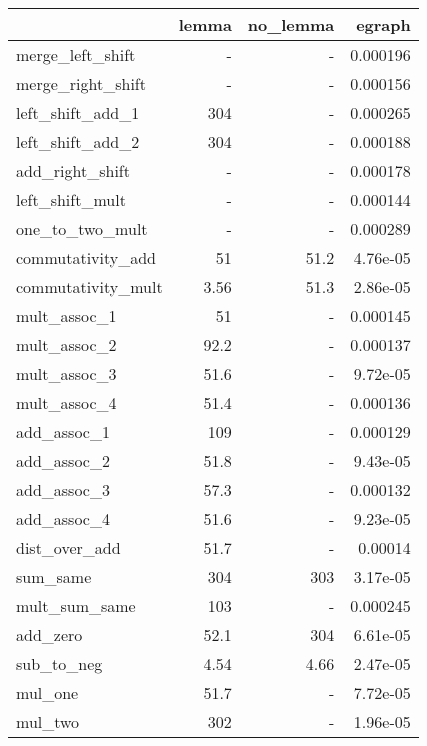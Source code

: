\begin{tabular}{lrrr}
\toprule
 & lemma & no_lemma & egraph \\
\midrule
merge_left_shift & - & - & 0.000196 \\
merge_right_shift & - & - & 0.000156 \\
left_shift_add_1 & 304 & - & 0.000265 \\
left_shift_add_2 & 304 & - & 0.000188 \\
add_right_shift & - & - & 0.000178 \\
left_shift_mult & - & - & 0.000144 \\
one_to_two_mult & - & - & 0.000289 \\
commutativity_add & 51 & 51.2 & 4.76e-05 \\
commutativity_mult & 3.56 & 51.3 & 2.86e-05 \\
mult_assoc_1 & 51 & - & 0.000145 \\
mult_assoc_2 & 92.2 & - & 0.000137 \\
mult_assoc_3 & 51.6 & - & 9.72e-05 \\
mult_assoc_4 & 51.4 & - & 0.000136 \\
add_assoc_1 & 109 & - & 0.000129 \\
add_assoc_2 & 51.8 & - & 9.43e-05 \\
add_assoc_3 & 57.3 & - & 0.000132 \\
add_assoc_4 & 51.6 & - & 9.23e-05 \\
dist_over_add & 51.7 & - & 0.00014 \\
sum_same & 304 & 303 & 3.17e-05 \\
mult_sum_same & 103 & - & 0.000245 \\
add_zero & 52.1 & 304 & 6.61e-05 \\
sub_to_neg & 4.54 & 4.66 & 2.47e-05 \\
mul_one & 51.7 & - & 7.72e-05 \\
mul_two & 302 & - & 1.96e-05 \\
\bottomrule
\end{tabular}
